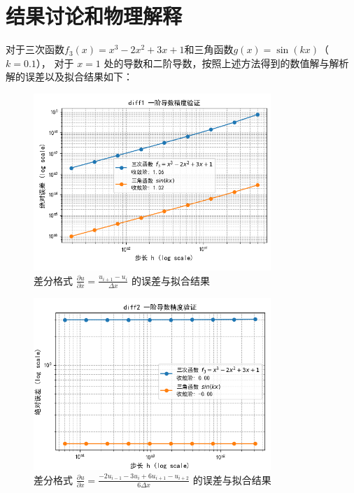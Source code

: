 \documentclass[UTF8]{ctexart}
\begin{document}
\section{结果讨论和物理解释}
对于三次函数$f_3(x) = x^3 - 2x^2 + 3x + 1$和三角函数$g(x) = \sin(kx)$（$k = 0.1$），
对于 $x = 1$ 处的导数和二阶导数，按照上述方法得到的数值解与解析解的误差以及拟合结果如下：

\begin{figure}[H]
    \centering
    \includegraphics[width=0.8\textwidth]{f1.png} 
    \caption{差分格式 $\frac{\partial u}{\partial x} = \frac{u_{i+1} - u_i}{\Delta x}$ 的误差与拟合结果}
    \label{fig:result1} 
\end{figure}
\begin{figure}[H]
    \centering
    \includegraphics[width=0.8\textwidth]{f2.png} 
    \caption{差分格式 $\frac{\partial u}{\partial x} = \frac{-2u_{i-1}-3u_i + 6u_{i+1} - u_{i+2}}{6\Delta x}$  的误差与拟合结果}
    \label{fig:result2} 
\end{figure}
\end{document}
